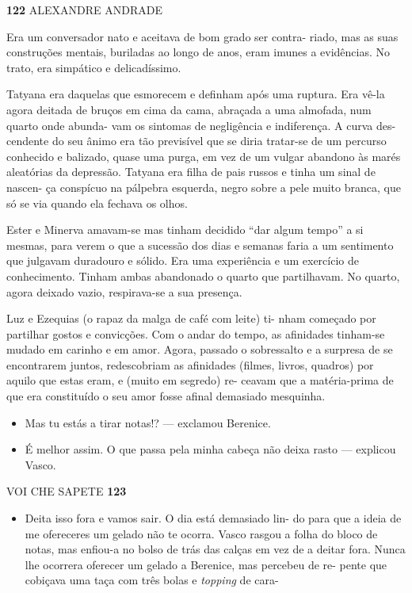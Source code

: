 \textbf{122 }ALEXANDRE ANDRADE

Era um conversador nato e aceitava de bom grado ser contra- riado, mas
as suas construções mentais, buriladas ao longo de anos, eram imunes a
evidências. No trato, era simpático e delicadíssimo.

Tatyana era daquelas que esmorecem e definham após uma ruptura. Era
vê-la agora deitada de bruços em cima da cama, abraçada a uma almofada,
num quarto onde abunda- vam os sintomas de negligência e indiferença. A
curva des- cendente do seu ânimo era tão previsível que se diria
tratar-se de um percurso conhecido e balizado, quase uma purga, em vez
de um vulgar abandono às marés aleatórias da depressão. Tatyana era
filha de pais russos e tinha um sinal de nascen- ça conspícuo na
pálpebra esquerda, negro sobre a pele muito branca, que só se via quando
ela fechava os olhos.

Ester e Minerva amavam-se mas tinham decidido ``dar algum tempo'' a si
mesmas, para verem o que a sucessão dos dias e semanas faria a um
sentimento que julgavam duradouro e sólido. Era uma experiência e um
exercício de conhecimento. Tinham ambas abandonado o quarto que
partilhavam. No quarto, agora deixado vazio, respirava-se a sua
presença.

Luz e Ezequias (o rapaz da malga de café com leite) ti- nham começado
por partilhar gostos e convicções. Com o andar do tempo, as afinidades
tinham-se mudado em carinho e em amor. Agora, passado o sobressalto e a
surpresa de se encontrarem juntos, redescobriam as afinidades (filmes,
livros, quadros) por aquilo que estas eram, e (muito em segredo) re-
ceavam que a matéria-prima de que era constituído o seu amor fosse
afinal demasiado mesquinha.

\begin{itemize}
\tightlist
\item
  Mas tu estás a tirar notas!? --- exclamou Berenice.
\item
  É melhor assim. O que passa pela minha cabeça não deixa rasto ---
  explicou Vasco.
\end{itemize}

VOI CHE SAPETE \textbf{123}

\begin{itemize}
\tightlist
\item
  Deita isso fora e vamos sair. O dia está demasiado lin- do para que a
  ideia de me ofereceres um gelado não te ocorra. Vasco rasgou a folha
  do bloco de notas, mas enfiou-a no bolso de trás das calças em vez de
  a deitar fora. Nunca lhe ocorrera oferecer um gelado a Berenice, mas
  percebeu de re- pente que cobiçava uma taça com três bolas e
  \emph{topping }de cara-
\end{itemize}

